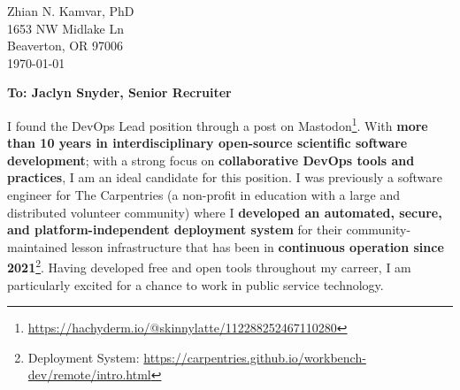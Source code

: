 


\clearpage
\begin{flushright}
  Zhian N. Kamvar, PhD\\
  1653 NW Midlake Ln\\
  Beaverton, OR 97006\\
  \today
\end{flushright}

\textbf{To: Jaclyn Snyder, Senior Recruiter}\\

\vspace{2ex}


I found the DevOps Lead position through a post on Mastodon\footnote{\url{https://hachyderm.io/@skinnylatte/112288252467110280}}. 
With \textbf{more than 10 years in interdisciplinary open-source scientific software development}; %
with a strong focus on \textbf{collaborative DevOps tools and practices}, %
I am an ideal candidate for this position. 
I was previously a software engineer for The Carpentries (a non-profit in education with a large and distributed volunteer community) where I \textbf{developed an automated, secure, and platform-independent deployment system} for their community-maintained lesson infrastructure that has been in \textbf{continuous operation since 2021}\footnote{Deployment System: \url{https://carpentries.github.io/workbench-dev/remote/intro.html}}.
Having developed free and open tools throughout my carreer, I am particularly excited for a chance to work in public service technology. 


